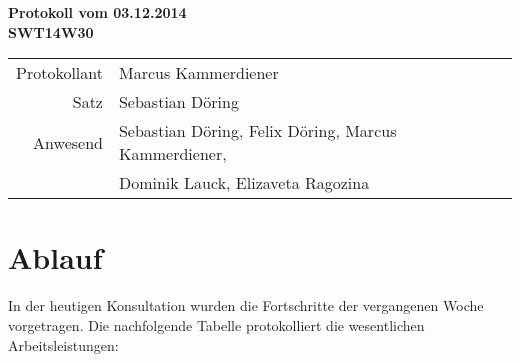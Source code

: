 \documentclass{scrartcl}
\begin{document}
\begin{center}
\LARGE \bf{Protokoll vom 03.12.2014 \\
SWT14W30}
\end{center}

\begin{tabular}{rp{10cm}}
Protokollant & Marcus Kammerdiener \\
Satz & Sebastian Döring \\
Anwesend & Sebastian Döring, Felix Döring, Marcus Kammerdiener,\\
& Dominik Lauck, Elizaveta Ragozina \\
\end{tabular}

\vspace*{3em}

\section{Ablauf}
In der heutigen Konsultation wurden die Fortschritte der vergangenen Woche vorgetragen. Die nachfolgende Tabelle protokolliert die wesentlichen Arbeitsleistungen:\\[.4cm]
\renewcommand{\arraystretch}{2}
\end{document}
